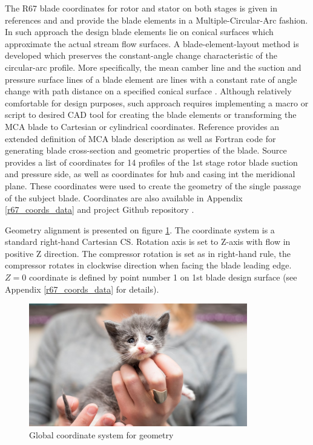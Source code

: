 The R67 blade coordinates for rotor and stator on both stages is given in references \citep{r67design} and \citep{r67performance} and provide the blade elements in a Multiple-Circular-Arc fashion. In such approach the design blade elements lie on conical surfaces which approximate the actual stream flow surfaces. A blade-element-layout method is developed which preserves the constant-angle change characteristic of the circular-arc profile. More specifically, the mean camber line and the suction and pressure surface lines of a blade element are lines with a constant rate of angle change with path distance on a specified conical surface \citep{bladecompose}. Although relatively comfortable for design purposes, such approach requires implementing a macro or script to desired CAD tool for creating the blade elements or transforming the MCA blade to Cartesian or cylindrical coordinates. Reference \citep{bladecompose} provides an extended definition of MCA blade description as well as Fortran code for generating blade cross-section and geometric properties of the blade. Source \citep{r67laser} provides a list of coordinates for 14 profiles of the 1st stage rotor blade suction and pressure side, as well as coordinates for hub and casing int the meridional plane. These coordinates were used to create the geometry of the single passage of the subject blade. Coordinates are also available in Appendix \ref{r67_coords_data} and project Github repository \citep{github}.

Geometry alignment is presented on figure \ref{geom_gcs}. The coordinate system is a standard right-hand Cartesian CS. Rotation axis is set to Z-axis with flow in positive Z direction. The compressor rotation is set as in right-hand rule, the compressor rotates in clockwise direction when facing the blade leading edge. $Z = 0$ coordinate is defined by point number 1 on 1st blade design surface (see Appendix \ref{r67_coords_data} for details). 

\begin{figure}[h!]
\centering %
\includegraphics[width=0.85\textwidth]{Pictures/kitten-placeholder.jpg}
\caption{Global coordinate system for geometry}
\label{geom_gcs}
\end{figure}

